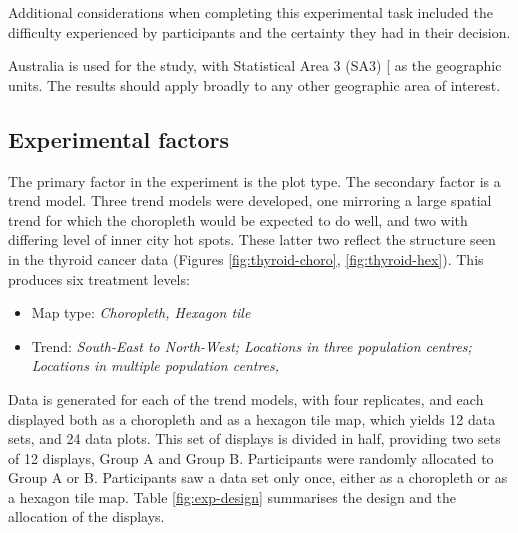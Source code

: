 \documentclass[
]{article}
\providecommand{\tightlist}{%
  \setlength{\itemsep}{0pt}\setlength{\parskip}{0pt}}
\begin{document}
Additional considerations when completing this experimental task
included the difficulty experienced by participants and the certainty
they had in their decision.

Australia is used for the study, with Statistical Area 3 (SA3)
{[}\citeproc{ref-abs2016}{15}{]} as the geographic units. The results
should apply broadly to any other geographic area of interest.

\subsection{Experimental factors}\label{experimental-factors}

The primary factor in the experiment is the plot type. The secondary
factor is a trend model. Three trend models were developed, one
mirroring a large spatial trend for which the choropleth would be
expected to do well, and two with differing level of inner city hot
spots. These latter two reflect the structure seen in the thyroid cancer
data (Figures \ref{fig:thyroid-choro}, \ref{fig:thyroid-hex}). This
produces six treatment levels:

\begin{itemize}
\tightlist
\item
  Map type: \emph{Choropleth, Hexagon tile}
\item
  Trend: \emph{South-East to North-West; Locations in three population
  centres; Locations in multiple population centres, }
\end{itemize}

Data is generated for each of the trend models, with four replicates,
and each displayed both as a choropleth and as a hexagon tile map, which
yields 12 data sets, and 24 data plots. This set of displays is divided
in half, providing two sets of 12 displays, Group A and Group B.
Participants were randomly allocated to Group A or B. Participants saw a
data set only once, either as a choropleth or as a hexagon tile map.
Table \ref{fig:exp-design} summarises the design and the allocation of
the displays.
\end{document}

